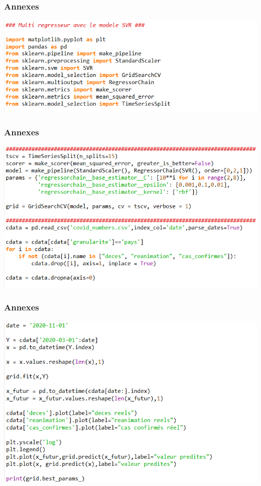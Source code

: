 \documentclass{beamer}[aspectratio = 43]
\begin{document}
\begin{frame}
	\frametitle{Annexes}
	\includegraphics[scale=0.55]{code_mr0}
\end{frame}

\begin{frame}
	\frametitle{Annexes}
	\includegraphics[scale=0.55]{code_mr1}
\end{frame}

\begin{frame}
	\frametitle{Annexes}
	\includegraphics[scale=0.55]{code_mr2}
\end{frame}
\end{document}
